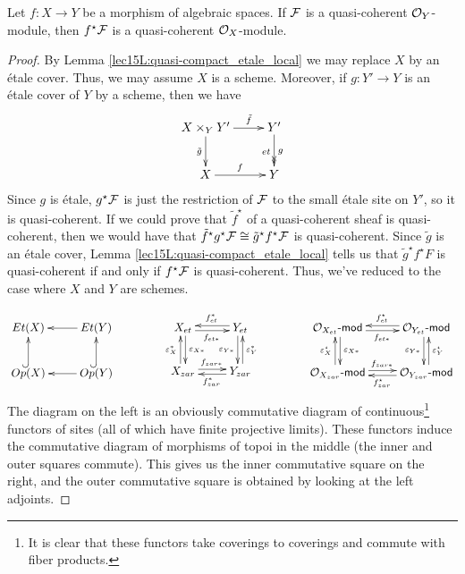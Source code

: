  \begin{lemma}
   Let $f:X\to Y$ be a morphism of algebraic spaces. If $\mathcal{F}$ is a quasi-coherent
   $\mathcal{O}_Y$-module, then $f^\star\mathcal{F}$ is a quasi-coherent $\mathcal{O}_X$-module.
 \end{lemma}
 \begin{proof}
   By Lemma \ref{lec15L:quasi-compact_etale_local} we may replace $X$ by an \'etale
   cover. Thus, we may assume $X$ is a scheme. Moreover, if $g:Y'\to Y$ is an \'etale
   cover of $Y$ by a scheme, then we have
   \[\xymatrix{
     X\times_Y Y' \ar[d]_{\tilde g} \ar[r]^<>(.5){\tilde f} & Y'\ar@{->>}[d]_{et}^g\\
     X \ar[r]^f & Y
   }\]
    Since $g$ is \'etale, $g^\star\mathcal{F}$ is just the restriction of $\mathcal{F}$ to the small
   \'etale site on $Y'$, so it is quasi-coherent. If we could prove that $\tilde f^\star$
   of a quasi-coherent sheaf is quasi-coherent, then we would have that $\tilde f^\star
   g^\star\mathcal{F}\cong \tilde g^\star f^\star\mathcal{F}$ is quasi-coherent. Since $\tilde g$ is an
   \'etale cover, Lemma \ref{lec15L:quasi-compact_etale_local} tells us that $\tilde
   g^\star f^\star F$ is quasi-coherent if and only if $f^\star\mathcal{F}$ is quasi-coherent.
   Thus, we've reduced to the case where $X$ and $Y$ are schemes.

   \[\xymatrix{
    Et(X) & Et(Y) \ar[l]\\
    Op(X)\ar@{^(->}[u] & Op(Y)\ar@{^(->}[u] \ar[l]
   }\qquad\qquad
   \xymatrix{
    X_{et} \ar@<.5ex>[d]^{\e_{X*}} \ar@<-.5ex>[r]_{f_{et*}}
    & Y_{et}\ar@<-.5ex>[d]_{\e_{Y*}} \ar@<-.5ex>[l]_{f_{et}^*} \\
    X_{zar} \ar@<.5ex>[u]^{\e_{X}^*} \ar@<.5ex>[r]^{f_{zar*}} &
    Y_{zar} \ar@<-.5ex>[u]_{\e_{Y}^*} \ar@<.5ex>[l]^{f_{zar}^*}
   }\qquad\qquad
   \xymatrix{
    \O_{X_{et}}\mod \ar@<.5ex>[d]^{\e_{X*}} \ar@<-.5ex>[r]_{f_{et*}}
    & \O_{Y_{et}}\mod\ar@<-.5ex>[d]_{\e_{Y*}} \ar@<-.5ex>[l]_{f_{et}^\star} \\
    \O_{X_{zar}}\mod \ar@<.5ex>[u]^{\e_{X}^\star} \ar@<.5ex>[r]^{f_{zar*}} &
    \O_{Y_{zar}}\mod \ar@<-.5ex>[u]_{\e_{Y}^\star} \ar@<.5ex>[l]^{f_{zar}^\star}
   }\]
    The diagram on the left is an obviously commutative diagram of continuous\footnote{It
   is clear that these functors take coverings to coverings and commute with fiber
   products.} functors of sites (all of which have finite projective limits). These
   functors induce the commutative diagram of morphisms of topoi in the middle (the inner
   and outer squares commute). This gives us the inner commutative square on the right,
   and the outer commutative square is obtained by looking at the left adjoints.


\end{proof}
